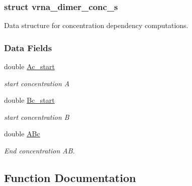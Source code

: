 \subsubsection{struct vrna\+\_\+dimer\+\_\+conc\+\_\+s}
Data structure for concentration dependency computations. \subsubsection*{Data Fields}
\begin{DoxyCompactItemize}
\item 
\mbox{\label{group__pf__cofold_a6e64ce1afbc93756afef06c0e3ccce97}} 
double \hyperlink{group__pf__cofold_a6e64ce1afbc93756afef06c0e3ccce97}{Ac\+\_\+start}
\begin{DoxyCompactList}\small\item\em start concentration A \end{DoxyCompactList}\item 
\mbox{\label{group__pf__cofold_a5763381efee22a0bbec2f2d0754f7697}} 
double \hyperlink{group__pf__cofold_a5763381efee22a0bbec2f2d0754f7697}{Bc\+\_\+start}
\begin{DoxyCompactList}\small\item\em start concentration B \end{DoxyCompactList}\item 
\mbox{\label{group__pf__cofold_aef56a1fe8d7f07e7b5d9a65417dda8a4}} 
double \hyperlink{group__pf__cofold_aef56a1fe8d7f07e7b5d9a65417dda8a4}{A\+Bc}
\begin{DoxyCompactList}\small\item\em End concentration AB. \end{DoxyCompactList}\end{DoxyCompactItemize}


\subsection{Function Documentation}
\mbox{\label{group__pf__cofold_ga4e5c7d06c302a7c59fc0d64dc142ca63}} 
